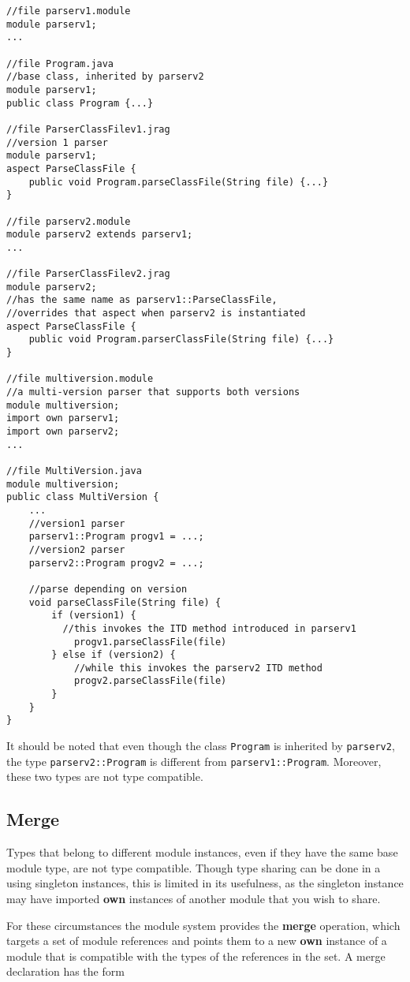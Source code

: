\begin{lstlisting}
//file parserv1.module
module parserv1;
...

//file Program.java
//base class, inherited by parserv2
module parserv1;
public class Program {...}

//file ParserClassFilev1.jrag
//version 1 parser
module parserv1;
aspect ParseClassFile {
	public void Program.parseClassFile(String file) {...}
}

//file parserv2.module
module parserv2 extends parserv1;
...

//file ParserClassFilev2.jrag
module parserv2;
//has the same name as parserv1::ParseClassFile, 
//overrides that aspect when parserv2 is instantiated
aspect ParseClassFile {
	public void Program.parserClassFile(String file) {...}
}

//file multiversion.module
//a multi-version parser that supports both versions
module multiversion;
import own parserv1;
import own parserv2;
...

//file MultiVersion.java
module multiversion;
public class MultiVersion {
	...
	//version1 parser
	parserv1::Program progv1 = ...;
	//version2 parser
	parserv2::Program progv2 = ...;
	
	//parse depending on version
	void parseClassFile(String file) {
		if (version1) {
		  //this invokes the ITD method introduced in parserv1
			progv1.parseClassFile(file)
		} else if (version2) {
			//while this invokes the parserv2 ITD method
			progv2.parseClassFile(file)
		}
	}
}
\end{lstlisting}

It should be noted that even though the class \texttt{Program}
is inherited by \texttt{parserv2}, the type
\texttt{parserv2::Program} is different from \texttt{parserv1::Program}. Moreover,
these two types are not type compatible.

\subsection{Merge}

Types that belong to different module instances, even if they have the same
base module type, are not type compatible. Though type sharing can be done
in a using singleton instances, this is limited in its usefulness, as the singleton
instance may have imported \textbf{own} instances of another module that you wish to
share.

For these circumstances the module system provides the \textbf{merge} operation,
which targets a set of module references and points them to a new \textbf{own} instance
of a module that is compatible with the types of the references in the set. A merge
declaration has the form

